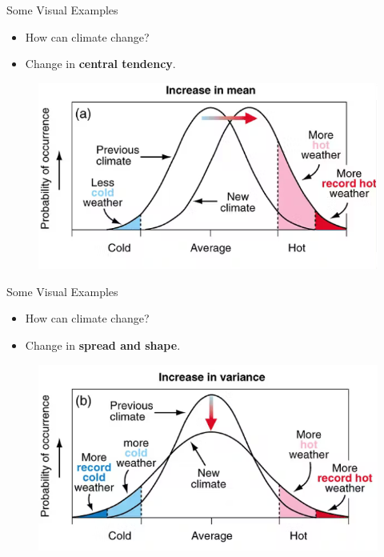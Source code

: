 \documentclass[
  ignorenonframetext,
]{beamer}
\providecommand{\tightlist}{%
  \setlength{\itemsep}{0pt}\setlength{\parskip}{0pt}}
\begin{document}
\begin{frame}{Some Visual Examples}
\label{some-visual-examples}
\begin{itemize}
\item
  How can climate change?
\item
  Change in \textbf{central tendency}.
\end{itemize}

\begin{figure}
\includegraphics[width=0.6\linewidth]{fig/climate1} \end{figure}
\end{frame}

\begin{frame}{Some Visual Examples}
\label{some-visual-examples-1}
\begin{itemize}
\tightlist
\item
  How can climate change?
\end{itemize}

\begin{itemize}
\tightlist
\item
  Change in \textbf{spread and shape}.
\end{itemize}

\begin{figure}
\includegraphics[width=0.6\linewidth]{fig/climate2} \end{figure}
\end{frame}
\end{document}
